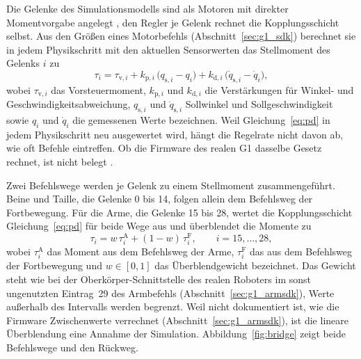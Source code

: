 Die Gelenke des Simulationsmodells sind als Motoren mit direkter Momentvorgabe angelegt \cite{MujocoDoku2026}, den Regler je Gelenk rechnet die Kopplungsschicht selbst.
Aus den Größen eines Motorbefehls (Abschnitt~\ref{sec:g1_sdk}) berechnet sie in jedem Physikschritt mit den aktuellen Sensorwerten das Stellmoment des Gelenks $i$ zu
\begin{equation}
  \tau_i = \tau_{\mathrm{v},i} + k_{\mathrm{p},i}\,\bigl(q_{\mathrm{s},i} - q_i\bigr) + k_{\mathrm{d},i}\,\bigl(\dot q_{\mathrm{s},i} - \dot q_i\bigr),
  \label{eq:pd}
\end{equation}
%
wobei $\tau_{\mathrm{v},i}$ das Vorsteuermoment, $k_{\mathrm{p},i}$ und $k_{\mathrm{d},i}$ die Verstärkungen für Winkel- und Geschwindigkeitsabweichung, $q_{\mathrm{s},i}$ und $\dot q_{\mathrm{s},i}$ Sollwinkel und Sollgeschwindigkeit sowie $q_i$ und $\dot q_i$ die gemessenen Werte bezeichnen.
Weil Gleichung~\ref{eq:pd} in jedem Physikschritt neu ausgewertet wird, hängt die Regelrate nicht davon ab, wie oft Befehle eintreffen.
Ob die Firmware des realen G1 dasselbe Gesetz rechnet, ist nicht belegt .

Zwei Befehlswege werden je Gelenk zu einem Stellmoment zusammengeführt.
Beine und Taille, die Gelenke 0 bis 14, folgen allein dem Befehlsweg der Fortbewegung.
Für die Arme, die Gelenke 15 bis 28, wertet die Kopplungsschicht Gleichung~\ref{eq:pd} für beide Wege aus und überblendet die Momente zu
\begin{equation}
  \tau_i = w\,\tau_i^{\mathrm{A}} + (1-w)\,\tau_i^{\mathrm{F}}, \qquad i = 15, \dots, 28,
  \label{eq:ueberblendung}
\end{equation}
%
wobei $\tau_i^{\mathrm{A}}$ das Moment aus dem Befehlsweg der Arme, $\tau_i^{\mathrm{F}}$ das aus dem Befehlsweg der Fortbewegung und $w \in [0, 1]$ das Überblendgewicht bezeichnet.
Das Gewicht steht wie bei der Oberkörper-Schnittstelle des realen Roboters im sonst ungenutzten Eintrag~29 des Armbefehls (Abschnitt~\ref{sec:g1_armsdk}), Werte außerhalb des Intervalls werden begrenzt.
Weil nicht dokumentiert ist, wie die Firmware Zwischenwerte verrechnet (Abschnitt~\ref{sec:g1_armsdk}), ist die lineare Überblendung eine Annahme der Simulation.
Abbildung~\ref{fig:bridge} zeigt beide Befehlswege und den Rückweg.

